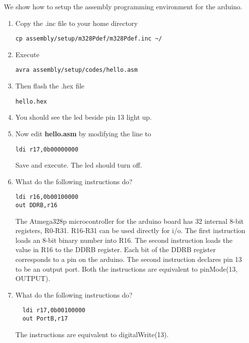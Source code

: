 
We show how to setup the assembly programming
environment for the arduino.
%
\begin{enumerate}[label=\arabic*.,ref=\theenumi]
\item Copy the .inc file to your home directory
\begin{lstlisting}
cp assembly/setup/m328Pdef/m328Pdef.inc ~/
\end{lstlisting}
\item Execute
\begin{lstlisting}
avra assembly/setup/codes/hello.asm
\end{lstlisting}
\item Then  flash the .hex file
\begin{lstlisting}
hello.hex
\end{lstlisting}
\item You should
see the led beside pin 13 light up.
\item Now edit \textbf{hello.asm} by modifying the line to
\begin{lstlisting}
ldi r17,0b00000000
\end{lstlisting}
Save and execute.  The led should turn off.
\item What do the following instructions do?
\begin{lstlisting}
ldi r16,0b00100000
out DDRB,r16
\end{lstlisting}
\solution The Atmega328p microcontroller for the arduino board has 32 internal 8-bit registers, R0-R31. R16-R31 can be used directly for i/o.  The first instruction loads an 8-bit binary number into  R16. The second instruction loads the value in R16 to the DDRB register.  Each bit of the DDRB register corresponds to a pin on the arduino. The second instruction declares pin 13 to be an output port. Both the instructions are equivalent to  pinMode(13, OUTPUT).  
\item What do the following instructions do?
\begin{lstlisting}
  ldi r17,0b00100000
  out PortB,r17
\end{lstlisting}
\solution The instructions are equivalent to digitalWrite(13).


\end{enumerate}



